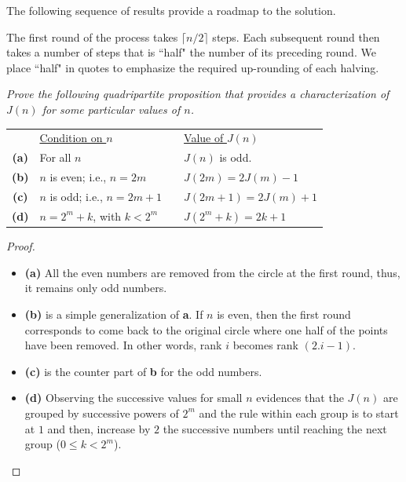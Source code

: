 \begin{itemize}
The following sequence of results provide a roadmap to the solution.

\medskip
%

The first round of the process takes $\lceil n/2 \rceil$ steps.  
Each subsequent round then takes a number of steps that is ``half" the number of its preceding round.  We place ``half" in quotes to emphasize the required up-rounding of each halving.  
\medskip

{\em Prove the following quadripartite proposition 
that provides a characterization of $J(n)$ for some particular values of $n$.

\begin{tabular}{clll}
 & \underline{Condition on $n$} & \hspace*{.1in} & \underline{Value of $J(n)$} \\ 
{\bf (a)} &
For all $n$ &  & $J(n)$ is odd. \\
{\bf (b)} &
$n$ is even; i.e., $n = 2m$ & & $J(2m) = 2J(m)-1$ \\
{\bf (c)} &
$n$ is odd; i.e., $n = 2m+1$ & & $J(2m+1) = 2J(m)+1$ \\
{\bf (d)} &
$n = 2^m+k$, with $k < 2^m$ & & $J(2^m+k) = 2k+1$
\end{tabular}
}

\begin{proof}
\begin{itemize}
\item {\bf (a)} 
All the even numbers are removed from the circle at the first round, thus, it remains only odd numbers.
\medskip

\item {\bf (b)} 
is a simple generalization of {\bf a}.  
If $n$ is even, then the first round corresponds to come back to the original circle 
where one half of the points have been removed. 
In other words, rank $i$ becomes rank $(2.i-1)$.
\medskip

\item {\bf (c)} 
is the counter part of {\bf b} for the odd numbers.

\item {\bf (d)} 
Observing the successive values for small $n$ evidences that the $J(n)$ are grouped by successive powers of $2^m$
and the rule within each group is to start at $1$ and then, increase by $2$ the successive numbers until reaching the next group
($0 \leq k < 2^m$).


\end{itemize}
\end{proof}
\end{itemize}
